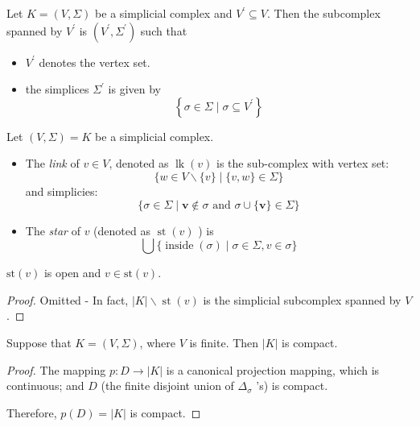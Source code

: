 \begin{definition} Let \(K = \left( {V,\Sigma }\right)\) be a simplicial complex and \({V}^{\prime } \subseteq  V\). Then the subcomplex spanned by \({V}^{\prime }\) is \(\left( {{V}^{\prime },{\Sigma }^{\prime }}\right)\) such that
\begin{itemize}
\item \({V}^{\prime }\) denotes the vertex set.
\item the simplices \({\Sigma }^{\prime }\) is given by
\[
\left\{  {\sigma  \in  \Sigma  \mid  \sigma  \subseteq  {V}^{\prime }}\right\}
\]
\end{itemize}
\end{definition}

\begin{definition}  \label{def:link_star} Let \(\left( {V,\Sigma }\right)  = K\) be a simplicial complex.
\begin{itemize}
\item The \emph{link} of \(v \in  V\), denoted as \(\operatorname{lk}\left( v\right)\) is the sub-complex with vertex set:
\[
\{ w \in  V \smallsetminus  \{ v\}  \mid  \{ v,w\}  \in  \Sigma \}
\]
and simplicies:
\[
\{ \sigma  \in  \Sigma  \mid  \mathbf{v} \notin  \sigma \text{ and }\sigma  \cup  \{ \mathbf{v}\}  \in  \Sigma \}
\]
\item The \emph{star} of \(v\) (denoted as \(\operatorname{st}\left( v\right)\) ) is
\[
\bigcup \{ \operatorname{inside}\left( \sigma \right)  \mid  \sigma  \in  \Sigma,v \in  \sigma \}
\]
\end{itemize}
\end{definition}

\begin{proposition} \(\mathrm{{st}}\left( v\right)\) is open and \(v \in  \mathrm{{st}}\left( v\right)\).
\end{proposition}
\begin{proof} Omitted - In fact, \(\left| K\right|  \smallsetminus  \operatorname{st}\left( v\right)\) is the simplicial subcomplex spanned by \(V\).
\end{proof}

\begin{proposition} Suppose that \(K = \left( {V,\Sigma }\right)\), where \(V\) is finite. Then \(\left| K\right|\) is compact.
\end{proposition}
\begin{proof} The mapping \(p: D \rightarrow  \left| K\right|\) is a canonical projection mapping, which is continuous; and \(D\) (the finite disjoint union of \({\Delta }_{\sigma }\) ’s) is compact.

Therefore, \(p\left( D\right)  = \left| K\right|\) is compact.
\end{proof}

